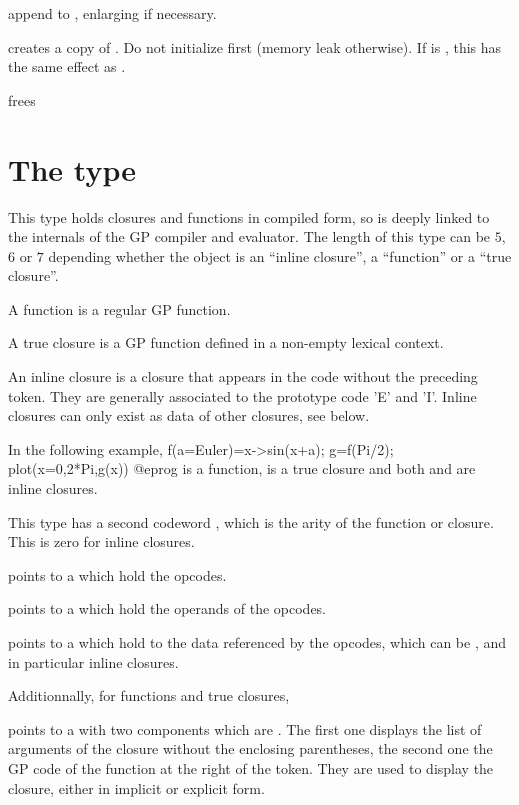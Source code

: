  append  to ,
enlarging  if necessary.

 creates a copy  of
. Do not initialize  first (memory leak otherwise). If
 is , this has the same effect as .

 frees 

\section{The type }
This type holds closures and functions in compiled form, so is deeply
linked to the internals of the GP compiler and evaluator.
The length of this type can be $5$, $6$ or $7$ depending whether the
object is an ``inline closure'', a ``function'' or a ``true closure''.

A function is a regular GP function.

A true closure is a GP function defined in a non-empty lexical context.

An inline closure is a closure that appears in the code without
the preceding \kbd{->} token. They are generally associated to the prototype
code 'E' and 'I'. Inline closures can only exist as data of other closures,
see below.

In the following example,
\bprog
f(a=Euler)=x->sin(x+a);
g=f(Pi/2);
plot(x=0,2*Pi,g(x))
@eprog\noindent
{} is a function,  is a true closure and both  and
 are inline closures.

This type has a second codeword , which is the arity of the
function or closure. This is zero for inline closures.

\item {} points to a  which hold the opcodes.

\item {} points to a  which hold the operands of the opcodes.

\item {} points to a  which hold to the data referenced by the
 opcodes, which can be , and in particular
inline closures.

Additionnally, for functions and true closures,

\item {} points to a  with two components which are .
The first one displays the list of arguments of the closure without the
enclosing parentheses, the second one the GP code of the function at the
right of the \kbd{->} token. They are used to display the closure, either in
implicit or explicit form.

